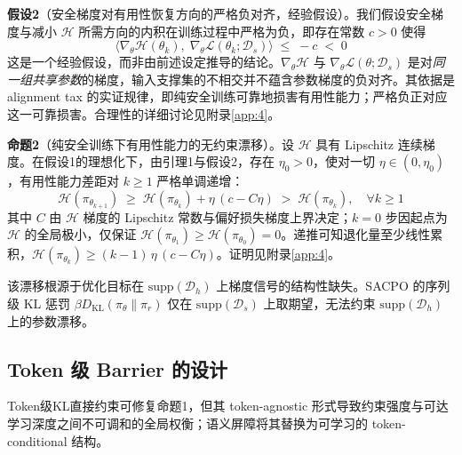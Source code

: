 \documentclass[lettersize,journal]{IEEEtran}
\begin{document}
\textbf{假设2}\label{jiashe2}（安全梯度对有用性恢复方向的严格负对齐，经验假设）。我们假设安全梯度与减小 $\mathcal{H}$ 所需方向的内积在训练过程中严格为负，即存在常数 $c > 0$ 使得
\begin{equation}\label{eq:assumption2}
    \big\langle \nabla_\theta \mathcal{H}(\theta_k),\; 
    \nabla_\theta \mathcal{L}(\theta_k; \mathcal{D}_s) 
    \big\rangle \;\leq\; -c \;<\; 0
\end{equation}
这是一个经验假设，而非由前述设定推导的结论。$\nabla_\theta\mathcal{H}$ 与 $\nabla_\theta\mathcal{L}(\theta;\mathcal{D}_s)$ 是对\textit{同一组共享参数}的梯度，输入支撑集的不相交并不蕴含参数梯度的负对齐。其依据是 alignment tax 的实证规律，即纯安全训练可靠地损害有用性能力\cite{yu2020gradient, kirkpatrick2017overcoming}；严格负正对应这一可靠损害。合理性的详细讨论见附录\ref{app:4}。

\textbf{命题2}（纯安全训练下有用性能力的无约束漂移）。设 $\mathcal{H}$ 具有 Lipschitz 连续梯度。在假设1的理想化下，由引理1与假设2，存在 $\eta_0 > 0$，使对一切 $\eta \in (0, \eta_0)$，有用性能力差距对 $k \geq 1$ 严格单调递增：
\begin{equation}\label{dandiaobujian}
    \mathcal{H}(\pi_{\theta_{k+1}}) \;\geq\; \mathcal{H}(\pi_{\theta_k}) 
    + \eta\,(c - C\eta) \;>\; \mathcal{H}(\pi_{\theta_k}), 
    \quad \forall k \geq 1
\end{equation}
其中 $C$ 由 $\mathcal{H}$ 梯度的 Lipschitz 常数与偏好损失梯度上界决定；$k = 0$ 步因起点为 $\mathcal{H}$ 的全局极小，仅保证 $\mathcal{H}(\pi_{\theta_1}) \geq \mathcal{H}(\pi_{\theta_0}) = 0$。递推可知退化量至少线性累积，$\mathcal{H}(\pi_{\theta_k}) \geq (k-1)\,\eta\,(c - C\eta)$。证明见附录\ref{app:4}。

该漂移根源于优化目标在 $\mathrm{supp}(\mathcal{D}_h)$ 上梯度信号的结构性缺失。SACPO 的序列级 KL 惩罚 $\beta D_{\mathrm{KL}}(\pi_\theta \| \pi_r)$ 仅在 $\mathrm{supp}(\mathcal{D}_s)$ 上取期望，无法约束 $\mathrm{supp}(\mathcal{D}_h)$ 上的参数漂移。

\subsection{Token 级 Barrier 的设计}\label{token barrier}
Token级KL直接约束可修复命题1，但其 token-agnostic 形式导致约束强度与可达学习深度之间不可调和的全局权衡；语义屏障将其替换为可学习的 token-conditional 结构。
\end{document}

